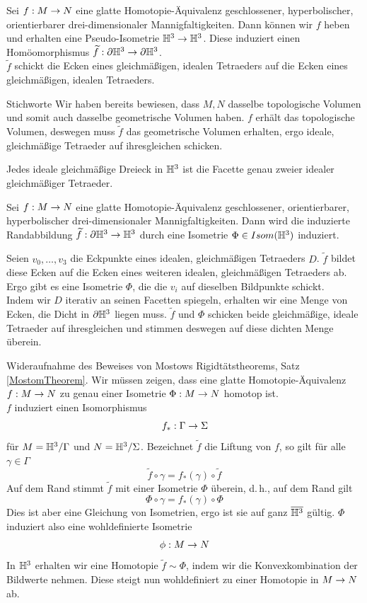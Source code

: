 \documentclass{book}
\begin{document}
\Lem{}
Sei $f : M \overset{}{\rightarrow} N$ eine glatte Homotopie-Äquivalenz geschlossener, hyperbolischer, orientierbarer drei-dimensionaler Mannigfaltigkeiten. Dann können wir $f$ heben und erhalten eine Pseudo-Isometrie $\mathbb{H}^3 \overset{}{\rightarrow} \mathbb{H}^3$. Diese induziert einen Homöomorphismus $\widetilde{f} : \partial \mathbb{H}^3 \overset{}{\rightarrow} \partial\mathbb{H}^3$.\\
$\widetilde{f}$ schickt die Ecken eines gleichmäßigen, idealen Tetraeders auf die Ecken eines gleichmäßigen, idealen Tetraeders.
\begin{Beweis}{Stichworte}
	Wir haben bereits bewiesen, dass $M,N$ dasselbe topologische Volumen und somit auch dasselbe geometrische Volumen haben. $f$ erhält das topologische Volumen, deswegen muss $\widetilde{f}$ das geometrische Volumen erhalten, ergo ideale, gleichmäßige Tetraeder auf ihresgleichen schicken.
\end{Beweis}

\Bem{}
Jedes ideale gleichmäßige Dreieck in $\mathbb{H}^3$ ist die Facette genau zweier idealer gleichmäßiger Tetraeder.

\Prop{}
Sei $f : M \overset{}{\rightarrow} N$ eine glatte Homotopie-Äquivalenz geschlossener, orientierbarer, hyperbolischer drei-dimensionaler Mannigfaltigkeiten. Dann wird die induzierte Randabbildung $\widetilde{f} : \partial \mathbb{H}^3 \overset{}{\rightarrow} \mathbb{H}^3$ durch eine Isometrie $\Phi \in Isom(\mathbb{H}^3)$ induziert.
\begin{Beweis}{}
	Seien $v_0,\ldots, v_3$ die Eckpunkte eines idealen, gleichmäßigen Tetraeders $D$. $\widetilde{f}$ bildet diese Ecken auf die Ecken eines weiteren idealen, gleichmäßigen Tetraeders ab. Ergo gibt es eine Isometrie $\Phi$, die die $v_i$ auf dieselben Bildpunkte schickt.\\
	Indem wir $D$ iterativ an seinen Facetten spiegeln, erhalten wir eine Menge von Ecken, die Dicht in $\partial \mathbb{H}^3$ liegen muss. $\widetilde{f}$ und $\Phi$ schicken beide gleichmäßige, ideale Tetraeder auf ihresgleichen und stimmen deswegen auf diese dichten Menge überein.
\end{Beweis}

\begin{Beweis}{Wideraufnahme des Beweises von Mostows Rigidtätstheorems, Satz \ref{MostomTheorem}.}
	Wir müssen zeigen, dass eine glatte Homotopie-Äquivalenz $f : M \overset{}{\rightarrow} N$ zu genau einer Isometrie $\Phi : M \overset{}{\rightarrow} N$ homotop ist.\\
	$f$ induziert einen Isomorphismus
	\[ f_* : \Gamma \overset{}{\rightarrow} \Sigma \]
	für $M = \mathbb{H}^3 / \Gamma$ und $N = \mathbb{H}^3 / \Sigma$. Bezeichnet $\widetilde{f}$ die Liftung von $f$, so gilt für alle $\gamma \in \Gamma$
	\[ \widetilde{f} \circ \gamma = f_*(\gamma) \circ \widetilde{f} \]
	Auf dem Rand stimmt $\widetilde{f}$ mit einer Isometrie $\Phi$ überein, d.\,h., auf dem Rand gilt
	\[ \Phi \circ \gamma = f_*(\gamma) \circ \Phi \]
	Dies ist aber eine Gleichung von Isometrien, ergo ist sie auf ganz $\overline{\mathbb{H}^3}$ gültig. $\Phi$ induziert also eine wohldefinierte Isometrie
	\[ \phi : M \overset{}{\rightarrow} N \]
	In $\mathbb{H}^3$ erhalten wir eine Homotopie $\widetilde{f} \sim \Phi$, indem wir die Konvexkombination der Bildwerte nehmen. Diese steigt nun wohldefiniert zu einer Homotopie in $M\overset{}{\rightarrow} N$ ab.
\end{Beweis}
\end{document}
